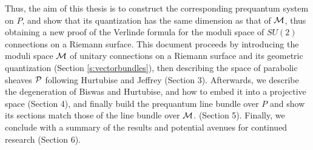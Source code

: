 	
	Thus, the aim of this thesis is to construct the corresponding prequantum system on $P$, and show that its quantization has the same dimension as that of $\mathcal{M}$, thus obtaining a new proof of the Verlinde formula for the moduli space of $SU(2)$ connections on a Riemann surface. This document proceeds by introducing the moduli space $\mathcal{M}$ of unitary connections on a Riemann surface and its geometric quantization (Section \ref{s:vectorbundles}), then describing the space of parabolic sheaves $\mathcal{P}$ following Hurtubise and Jeffrey (Section 3). Afterwards, we describe the degeneration of Biswas and Hurtubise, and how to embed it into a projective space (Section 4), and finally build the prequantum line bundle over $P$ and show its sections match those of the line bundle over $\mathcal{M}$. (Section 5). Finally, we conclude with a summary of the results and potential avenues for continued research (Section 6).

